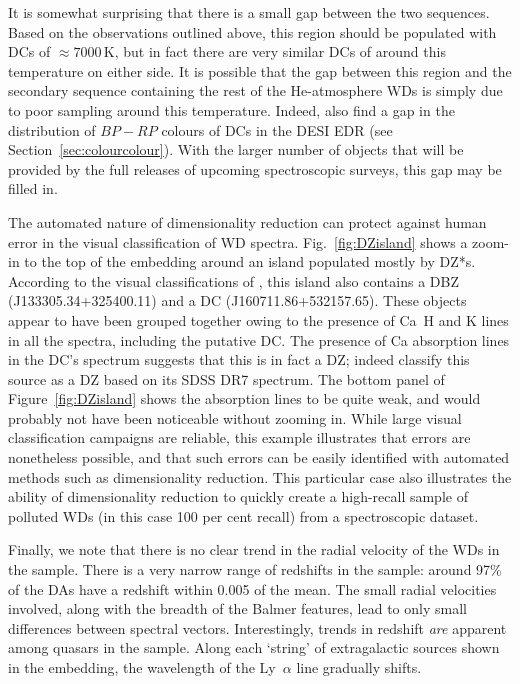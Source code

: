 \documentclass[fleqn,usenatbib]{mnras}
\begin{document}
It is somewhat surprising that there is a small gap between the two sequences.
Based on the observations outlined above, this region should be populated with DCs of $\approx7000\,\text{K}$, but in fact there are very similar DCs of around this temperature on either side.
It is possible that the gap between this region and the secondary sequence containing the rest of the He-atmosphere WDs is simply due to poor sampling around this temperature.
Indeed, \citet{manser24} also find a gap in the distribution of $\mathit{BP}-\mathit{RP}$ colours of DCs in the DESI EDR (see Section~\ref{sec:colourcolour}).
With the larger number of objects that will be provided by the full releases of upcoming spectroscopic surveys, this gap may be filled in.

The automated nature of dimensionality reduction can protect against human error in the visual classification of WD spectra.
Fig.~\ref{fig:DZisland} shows a zoom-in to the top of the embedding around an island populated mostly by DZ*s.
According to the visual classifications of \citet{manser24}, this island also contains a DBZ (J133305.34+325400.11) and a DC (J160711.86+532157.65).
These objects appear to have been grouped together owing to the presence of Ca~H and K lines in all the spectra, including the putative DC.
The presence of Ca absorption lines in the DC's spectrum suggests that this is in fact a DZ; indeed \citet{kleinman13} classify this source as a DZ based on its SDSS DR7 spectrum.
The bottom panel of Figure~\ref{fig:DZisland} shows the absorption lines to be quite weak, and would probably not have been noticeable without zooming in.
While large visual classification campaigns are reliable, this example illustrates that errors are nonetheless possible, and that such errors can be easily identified with automated methods such as dimensionality reduction.
This particular case also illustrates the ability of dimensionality reduction to quickly create a high-recall sample of polluted WDs (in this case 100 per cent recall) from a spectroscopic dataset.

Finally, we note that there is no clear trend in the radial velocity of the WDs in the sample.
There is a very narrow range of redshifts in the sample: around 97\% of the DAs have a redshift within 0.005 of the mean.
The small radial velocities involved, along with the breadth of the Balmer features, lead to only small differences between spectral vectors.
Interestingly, trends in redshift \textit{are} apparent among quasars in the sample.
Along each `string' of extragalactic sources shown in the embedding, the wavelength of the Ly~$\alpha$ line gradually shifts.
\end{document}
